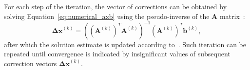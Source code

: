 For each step of the iteration, the vector of corrections can be obtained by solving Equation~\ref{eq:numerical_axb} using the pseudo-inverse of the $\mathbf{A}$ matrix~\cite{optimization}:
\begin{equation}
  \label{eq:numerical_solution}
  \mathbf{\Delta x}^{(k)}  = \left( (\mathbf{A}^{(k)})^T\mathbf{A}^{(k)} \right)^{-1} (\mathbf{A}^{(k)})^{T} \mathbf{b}^{(k)},
\end{equation}
after which the solution estimate is updated according to~. Such iteration can be repeated until convergence is indicated by insignificant values of subsequent correction vectors $\mathbf{\Delta x}^{(k)}$.

